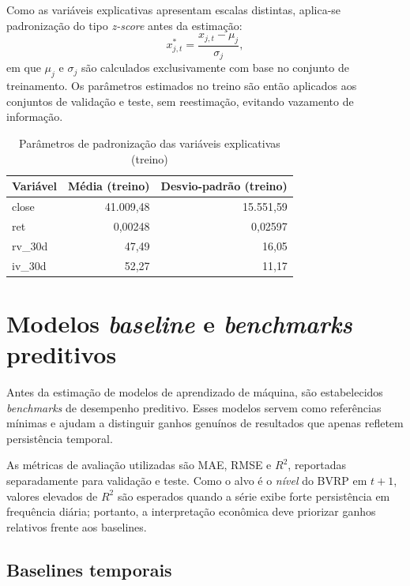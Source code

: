 Como as variáveis explicativas apresentam escalas distintas, aplica-se padronização
do tipo \textit{z-score} antes da estimação:
\begin{equation}
x^{\ast}_{j,t} = \frac{x_{j,t} - \mu_j}{\sigma_j},
\end{equation}
em que $\mu_j$ e $\sigma_j$ são calculados exclusivamente com base no conjunto de
treinamento. Os parâmetros estimados no treino são então aplicados aos conjuntos de
validação e teste, sem reestimação, evitando vazamento de informação.

\begin{table}[H]
\centering
\caption{Parâmetros de padronização das variáveis explicativas (treino)}
\label{tab:cap6_scaler_stats}
\footnotesize
\begin{tabular}{lrr}
\toprule
Variável & Média (treino) & Desvio-padrão (treino) \\
\midrule
close   & 41.009{,}48 & 15.551{,}59 \\
ret     & 0{,}00248   & 0{,}02597   \\
rv\_30d & 47{,}49     & 16{,}05     \\
iv\_30d & 52{,}27     & 11{,}17     \\
\bottomrule
\end{tabular}
\end{table}

\section{Modelos \textit{baseline} e \textit{benchmarks} preditivos}
\label{sec:cap6_baselines}

Antes da estimação de modelos de aprendizado de máquina, são estabelecidos
\textit{benchmarks} de desempenho preditivo. Esses modelos servem como referências
mínimas e ajudam a distinguir ganhos genuínos de resultados que apenas refletem
persistência temporal.

As métricas de avaliação utilizadas são MAE, RMSE e $R^2$, reportadas
separadamente para validação e teste. Como o alvo é o \textit{nível} do BVRP em
$t+1$, valores elevados de $R^2$ são esperados quando a série exibe forte
persistência em frequência diária; portanto, a interpretação econômica deve
priorizar ganhos relativos frente aos baselines.

\subsection{Baselines temporais}
\label{subsec:cap6_baselines_temporais}

